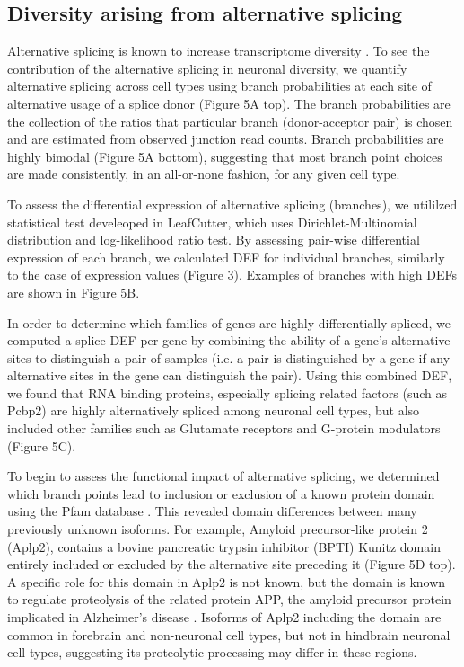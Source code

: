 \subsection{Diversity arising from alternative splicing}

Alternative splicing is known to increase transcriptome diversity \citep{ Andreadis_1987}. To see the contribution of the alternative splicing in neuronal diversity, we quantify alternative splicing across cell types using branch probabilities at each site of alternative usage of a splice donor (Figure 5A top). The branch probabilities are the collection of the ratios that particular branch (donor-acceptor pair) is chosen and are estimated from observed junction read counts. Branch probabilities are highly bimodal (Figure 5A bottom), suggesting that most branch point choices are made consistently, in an all-or-none fashion, for any given cell type.

To assess the differential expression of alternative splicing (branches), we utililzed statistical test develeoped in LeafCutter\citep{Li_2016}, which uses Dirichlet-Multinomial distribution and log-likelihood ratio test. By assessing pair-wise differential expression of each branch, we calculated DEF for individual branches, similarly to the case of expression values (Figure 3). Examples of branches with high DEFs are shown in Figure 5B. 

In order to determine which families of genes are highly differentially spliced, we computed a splice DEF per gene by combining the ability of a gene’s alternative sites to distinguish a pair of samples (i.e. a pair is distinguished by a gene if any alternative sites in the gene can distinguish the pair). Using this combined DEF, we found that RNA binding proteins, especially splicing related factors (such as Pcbp2) are highly alternatively spliced among neuronal cell types, but also included other families such as Glutamate receptors and G-protein modulators (Figure 5C). 

To begin to assess the functional impact of alternative splicing, we determined which branch points lead to inclusion or exclusion of a known protein domain using the Pfam database \citep{Finn_2015}. This revealed domain differences between many previously unknown isoforms. For example, Amyloid precursor-like protein 2 (Aplp2), contains a bovine pancreatic trypsin inhibitor (BPTI) Kunitz domain entirely included or excluded by the alternative site preceding it (Figure 5D top). A specific role for this domain in Aplp2 is not known, but the domain is known to regulate proteolysis of the related protein APP, the amyloid precursor protein implicated in Alzheimer's disease \citep{Beckmann_2016}. Isoforms of Aplp2 including the domain are common in forebrain and non-neuronal cell types, but not in hindbrain neuronal cell types, suggesting its proteolytic processing may differ in these regions.


